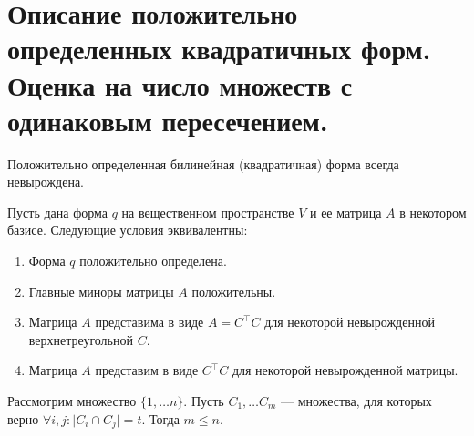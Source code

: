 \section{Описание положительно определенных квадратичных форм. Оценка на число множеств с одинаковым пересечением.}

\begin{lm}
    Положительно определенная билинейная (квадратичная) форма всегда невырождена.
\end{lm}
\begin{thm}
    Пусть дана форма $ q$ на вещественном пространстве  $ V$ и ее матрица  $ A$ в некотором базисе. Следующие условия эквивалентны:
     \begin{enumerate}[noitemsep]
        \item Форма $ q$ положительно определена.
	\item Главные миноры матрицы  $ A$ положительны.
	\item Матрица  $ A$ представима в виде  $ A = C^{\top}C$ для некоторой невырожденной верхнетреугольной $ C$.
	\item Матрица  $ A$ представим в виде  $ C^{\top} C$ для некоторой невырожденной матрицы.
    \end{enumerate} 
\end{thm}
\begin{st}
    Рассмотрим множество $ \{1, \ldots n\}$. Пусть $ C_1, \ldots C_m$ --- множества, для которых верно $\forall i, j \colon  \lvert C_i \cap C_j \rvert = t $. Тогда $ m \le n$.
\end{st}
